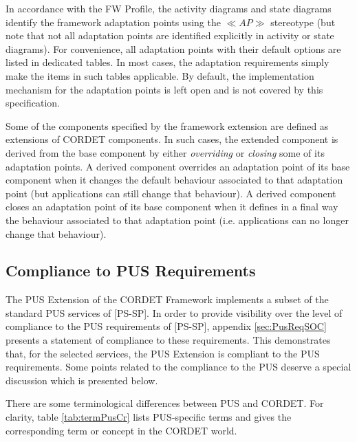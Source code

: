 \documentclass[a4paper,10pt]{article}
\begin{document}
In accordance with the FW Profile, the activity diagrams and state diagrams identify the framework adaptation points using the $\ll AP \gg$ stereotype (but note that not all adaptation points are identified explicitly in activity or state diagrams). 
For convenience, all adaptation points with their default options are listed in dedicated tables. 
In most cases, the adaptation requirements simply make the items in such tables applicable. By default, the implementation mechanism for the adaptation points is left open and is not covered by this specification. 

Some of the components specified by the framework extension are defined as extensions of CORDET components. In such cases, the extended component is derived from the base component by either \textit{overriding} or \textit{closing} some of its adaptation points. 
A derived component overrides an adaptation point of its base component when it changes the default behaviour associated to that adaptation point (but applications can still change that behaviour). 
A derived component closes an adaptation point of its base component when it defines in a final way the behaviour associated to that adaptation point (i.e. applications can no longer change that behaviour).

\subsection{Compliance to PUS Requirements}\label{sec:ComplianceToPus}
The PUS Extension of the CORDET Framework implements a subset of the standard PUS services of [PS-SP]. In order to provide visibility over the level of compliance to the PUS requirements of [PS-SP], appendix \ref{sec:PusReqSOC} presents a statement of compliance to these requirements. This demonstrates that, for the selected services, the PUS Extension is compliant to the PUS requirements. Some points related to the compliance to the PUS deserve a special discussion which is presented below. 

There are some terminological differences between PUS and CORDET. For clarity, table \ref{tab:termPusCr} lists PUS-specific terms and gives the corresponding term or concept in the CORDET world. 
\end{document}
